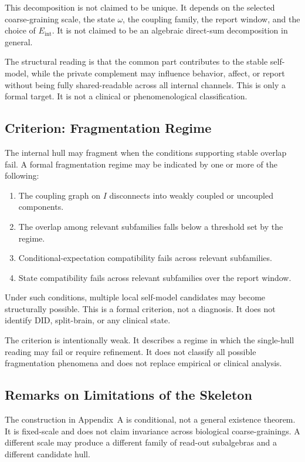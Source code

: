 \documentclass[12pt]{article}
\theoremstyle{definition}
\theoremstyle{remark}
\begin{document}
This decomposition is not claimed to be unique. It depends on the
selected coarse-graining scale, the state \(\omega\), the coupling
family, the report window, and the choice of \(E_{\mathrm{int}}\). It is
not claimed to be an algebraic direct-sum decomposition in general.

The structural reading is that the common part contributes to the
stable self-model, while the private complement may influence behavior,
affect, or report without being fully shared-readable across all
internal channels. This is only a formal target. It is not a clinical or
phenomenological classification.

\subsection{Criterion: Fragmentation Regime}

The internal hull may fragment when the conditions supporting stable
overlap fail. A formal fragmentation regime may be indicated by one or
more of the following:
\begin{enumerate}[label=(F\arabic*)]
\item The coupling graph on \(I\) disconnects into weakly coupled or
uncoupled components.
\item The overlap among relevant subfamilies falls below a threshold
set by the regime.
\item Conditional-expectation compatibility fails across relevant
subfamilies.
\item State compatibility fails across relevant subfamilies over the
report window.
\end{enumerate}

Under such conditions, multiple local self-model candidates may become
structurally possible. This is a formal criterion, not a diagnosis. It
does not identify DID, split-brain, or any clinical state.

The criterion is intentionally weak. It describes a regime in which the
single-hull reading may fail or require refinement. It does not classify
all possible fragmentation phenomena and does not replace empirical or
clinical analysis.

\subsection{Remarks on Limitations of the Skeleton}

The construction in Appendix~A is conditional, not a general existence
theorem. It is fixed-scale and does not claim invariance across
biological coarse-grainings. A different scale may produce a different
family of read-out subalgebras and a different candidate hull.
\end{document}
